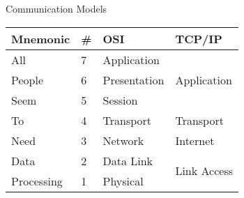 \documentclass[12pt]{beamer}
\begin{document}
  \begin{frame}{Communication Models}

          \pause

      \begin{tabular}{|l|l|l|l|}
        \hline
        \textbf{Mnemonic}&  \textbf{\#} & \textbf{OSI} & \textbf{TCP/IP}              \\ \hline
        All              &  7           & Application  & \multirow{3}{*}{Application} \\ \cline{1-3}
        People           &  6           & Presentation &                              \\ \cline{1-3}
        Seem             &  5           & Session      &                              \\ \hline
        To               &  4           & Transport    & Transport                    \\ \hline
        Need             &  3           & Network      & Internet                     \\ \hline
        Data             &  2           & Data Link    & \multirow{2}{*}{Link Access} \\ \cline{1-3}
        Processing       &  1           & Physical     &                              \\ \hline
      \end{tabular}

      \vspace*{-4.21cm}
      \pause
  \end{frame}
\end{document}
